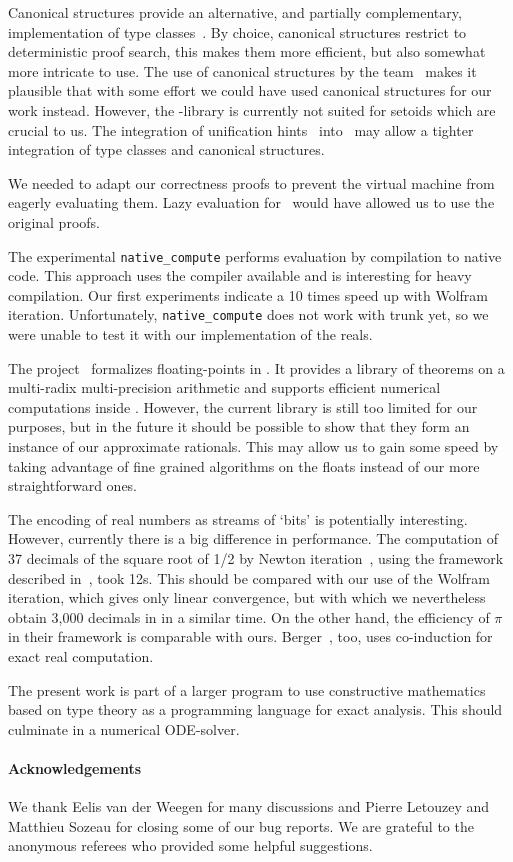 \documentclass[a4paper,10pt,runningheads]{llncs}
\begin{document}
Canonical structures provide an alternative, and partially complementary, implementation of type classes~\cite{adhoc}. By choice, canonical structures restrict to deterministic proof search, this makes them more efficient, but also somewhat more intricate to use. The use of canonical structures by the \Ssreflect{} team~\cite{packed} makes it plausible that with some effort we could have used canonical structures for our work instead. However, the \Ssreflect-library is currently not suited for setoids which are crucial to us. The integration of unification hints~\cite{Hints} into \Coq\ may allow a tighter integration of type classes and canonical structures.

We needed to adapt our correctness proofs to prevent the virtual machine from eagerly evaluating them. Lazy evaluation for \prop\ would have allowed us to use the original proofs.

The experimental \lstinline|native_compute| performs evaluation by compilation to native \OCaml{} code. This approach uses the \OCaml{} compiler available and is interesting for heavy compilation. Our first experiments indicate a 10 times speed up with Wolfram iteration. Unfortunately, \lstinline|native_compute| does not work with \Coq{} trunk yet, so we were unable to test it with our implementation of the reals.

The \Flocq{} project~\cite{BolMel11} formalizes floating-points in \Coq. It provides a library of theorems on a multi-radix multi-precision arithmetic and supports efficient numerical computations inside \Coq. However, the current library is still too limited for our purposes, but in the future it should be possible to show that they form an instance of our approximate rationals. This may allow us to gain some speed by taking advantage of fine grained algorithms on the floats instead of our more straightforward ones.

The encoding of real numbers as streams of `bits' is potentially interesting. However, currently there is a big difference in performance. The computation of 37 decimals of the square root of 1/2 by Newton iteration~\cite{JulienP09}, using the framework described in~\cite{bertot2007affine,julien2008certified}, took 12s. This should be compared with our use of the Wolfram iteration, which gives only linear convergence, but with which we nevertheless obtain 3,000 decimals in in a similar time. On the other hand, the efficiency of $\pi$ in their framework is comparable with ours. Berger~\cite{berger2009coinductive}, too, uses co-induction for exact real computation.

The present work is part of a larger program to use constructive mathematics based on type theory as a programming language for exact analysis. This should culminate in a numerical ODE-solver.

\paragraph{Acknowledgements}
We thank Eelis van der Weegen for many discussions and Pierre Letouzey and Matthieu Sozeau for closing some of our bug reports. We are grateful to the anonymous referees who provided some helpful suggestions.



\end{document}
